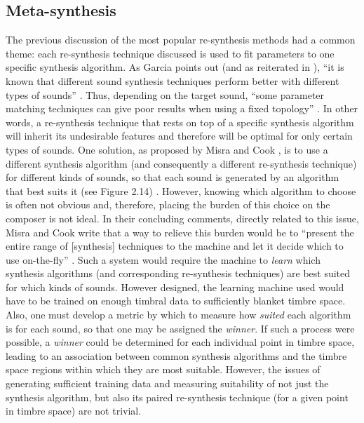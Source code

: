 \documentclass[a4paper,12pt]{report} 	%
\numberwithin{figure}{chapter}
\numberwithin{table}{chapter}
\numberwithin{equation}{chapter}
\begin{document}
\begin{flushleft}
\section{Meta-synthesis}

The previous discussion of the most popular re-synthesis methods had a common theme: each re-synthesis technique discussed is used to fit parameters to one specific synthesis algorithm. As Garcia points out (and as reiterated in \cite[p. 103]{Tolonen:1998bh}), ``it is known that different sound synthesis techniques perform better with different types of sounds'' \cite[p. 1]{Garcia:2001jw}. Thus, depending on the target sound, ``some parameter matching techniques can give poor results when using a fixed topology'' \cite[p. 1]{Garcia:2000th}. In other words, a re-synthesis technique that rests on top of a specific synthesis algorithm will inherit its undesirable features and therefore will be optimal for only certain types of sounds. One solution, as proposed by Misra and Cook \cite{Misra:2009km}, is to use a different synthesis algorithm (and consequently a different re-synthesis technique) for different kinds of sounds, so that each sound is generated by an algorithm that best suits it (see Figure 2.14) \cite[p. 1]{Misra:2009km}. However, knowing which algorithm to choose is often not obvious and, therefore, placing the burden of this choice on the composer is not ideal. In their concluding comments, directly related to this issue, Misra and Cook write that a way to relieve this burden would be to ``present the entire range of [synthesis] techniques to the machine and let it decide which to use on-the-fly''  \cite[p. 5]{Misra:2009km}. Such a system would require the machine to \emph{learn} which synthesis algorithms (and corresponding re-synthesis techniques) are best suited for which kinds of sounds. However designed, the learning machine used would have to be trained on enough timbral data to sufficiently blanket timbre space. Also, one must develop a metric by which to measure how \emph{suited} each algorithm is for each sound, so that one may be assigned the \emph{winner}. If such a process were possible, a \emph{winner} could be determined for each individual point in timbre space, leading to an association between common synthesis algorithms and the timbre space regions within which they are most suitable. However, the issues of generating sufficient training data and measuring suitability of not just the synthesis algorithm, but also its paired re-synthesis technique (for a given point in timbre space) are not trivial.
\\

\end{flushleft}
\end{document}
